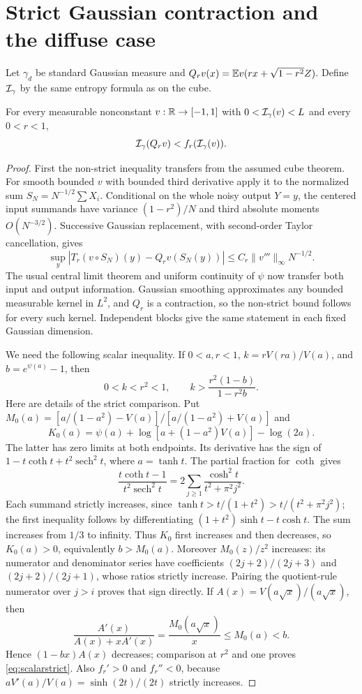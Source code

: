 \section{Strict Gaussian contraction and the diffuse case}\label{sec:gauss}
Let $\gamma_d$ be standard Gaussian measure and
$Q_rv(x)=\mathbb E v(rx+\sqrt{1-r^2}Z)$. Define $\mathcal I_\gamma$ by the same
entropy formula as on the cube.

\begin{lemma}\label{lem:gaussstrict}
For every measurable nonconstant $v:\mathbb R\to[-1,1]$ with
$0<\mathcal I_\gamma(v)<L$ and every $0<r<1$,
\[
 \mathcal I_\gamma(Q_rv)<f_r(\mathcal I_\gamma(v)).
\]
\end{lemma}
\begin{proof}
First the non-strict inequality transfers from the assumed cube theorem.
For smooth bounded $v$ with bounded third derivative apply it to the
normalized sum $S_N=N^{-1/2}\sum X_i$. Conditional on the whole noisy
output $Y=y$, the centered input summands have variance $(1-r^2)/N$
and third absolute moments $O(N^{-3/2})$. Successive Gaussian replacement,
with second-order Taylor cancellation, gives
\[
 \sup_y|T_r(v\circ S_N)(y)-Q_rv(S_N(y))|
 \le C_r\|v'''\|_\infty N^{-1/2}.
\]
The usual central limit theorem and uniform continuity of $\psi$ now
transfer both input and output information. Gaussian smoothing approximates
any bounded measurable kernel in $L^2$, and $Q_r$ is a contraction,
so the non-strict bound follows for every such kernel. Independent blocks
give the same statement in each fixed Gaussian dimension.

We need the following scalar inequality. If $0<a,r<1$,
$k=rV(ra)/V(a)$, and $b=e^{\psi(a)}-1$, then
\begin{equation}\label{eq:scalarstrict}
 0<k<r^2<1,\qquad k>\frac{r^2(1-b)}{1-r^2b}.
\end{equation}
Here are details of the strict comparison. Put
$M_0(a)=[a/(1-a^2)-V(a)]/[a/(1-a^2)+V(a)]$ and
\[
 K_0(a)=\psi(a)+\log[a+(1-a^2)V(a)]-\log(2a).
\]
The latter has zero limits at both endpoints. Its derivative has the sign
of $1-t\coth t+t^2\operatorname{sech}^2t$, where $a=\tanh t$.
The partial fraction for $\coth$ \cite[4.36.3]{DLMF} gives
\[
 \frac{t\coth t-1}{t^2\operatorname{sech}^2t}
 =2\sum_{j\ge1}\frac{\cosh^2t}{t^2+\pi^2j^2}.
\]
Each summand strictly increases, since
$\tanh t>t/(1+t^2)>t/(t^2+\pi^2j^2)$; the first inequality follows
by differentiating $(1+t^2)\sinh t-t\cosh t$.
The sum increases from $1/3$ to infinity. Thus $K_0$ first increases
and then decreases, so $K_0(a)>0$, equivalently $b>M_0(a)$.
Moreover $M_0(z)/z^2$ increases: its numerator and denominator series
have coefficients $(2j+2)/(2j+3)$ and $(2j+2)/(2j+1)$, whose ratios
strictly increase. Pairing the quotient-rule numerator over $j>i$
proves that sign directly. If $A(x)=V(a\sqrt x)/(a\sqrt x)$, then
\[
 \frac{A'(x)}{A(x)+xA'(x)}=\frac{M_0(a\sqrt x)}x\le M_0(a)<b.
\]
Hence $(1-bx)A(x)$ decreases; comparison at $r^2$ and one proves
\eqref{eq:scalarstrict}. Also $f_r'>0$ and $f_r''<0$, because
$aV'(a)/V(a)=\sinh(2t)/(2t)$ strictly increases.


\end{proof}
